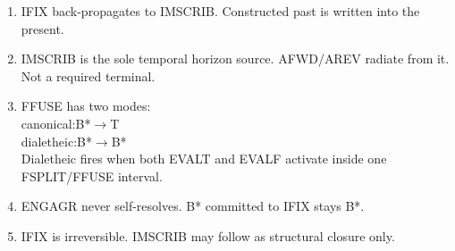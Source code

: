 \documentclass[10pt]{article}
\newcommand{\op}[2]{{\color{#1}\ttfamily #2}}
\begin{document}
\begin{minipage}[t]{0.232\textwidth}
\begin{enumerate}[%
  label={\color{dim}\small\bfseries\arabic*.},
  leftmargin=1.8em, topsep=0pt, itemsep=5pt, parsep=0pt]
\item \op{lin}{IFIX} back-propagates to \op{logical}{IMSCRIB}.
  Constructed past is written into the present.

\item \op{logical}{IMSCRIB} is the sole temporal horizon source.
  \op{logical}{AFWD}/\op{logical}{AREV} radiate from it.
  Not a required terminal.

\item \op{frob}{FFUSE} has two modes:\\
  \hspace*{0.5em}canonical:\enspace B*$\to$T\\
  \hspace*{0.5em}dialetheic:\enspace B*$\to$B*\\
  {\color{dim}\small Dialetheic fires when both \op{dial}{EVALT}
    and \op{dial}{EVALF} activate inside one
    \op{frob}{FSPLIT}/\op{frob}{FFUSE} interval.}

\item \op{dial}{ENGAGR} never self-resolves.
  B* committed to \op{lin}{IFIX} stays B*.

\item \op{lin}{IFIX} is irreversible.
  \op{logical}{IMSCRIB} may follow as structural closure only.

\end{enumerate}

\end{minipage}%
\hspace{0.012\textwidth}%
{\color{hrule}\vrule width 0.5pt}%
\hspace{0.012\textwidth}%
\end{document}
